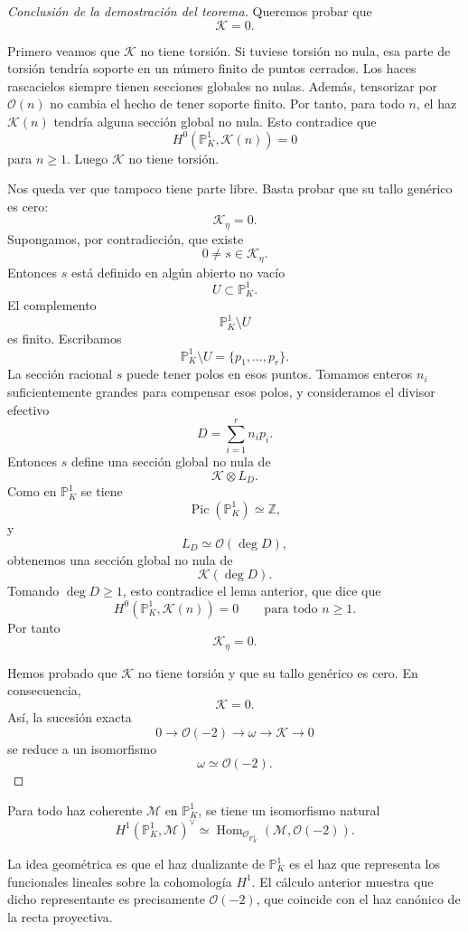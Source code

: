 \begin{proof}[Conclusión de la demostración del teorema]
Queremos probar que
\[
\mathcal{K}=0.
\]

Primero veamos que $\mathcal{K}$ no tiene torsión. Si tuviese torsión no nula, esa parte de torsión tendría soporte en un número finito de puntos cerrados. Los haces rascacielos siempre tienen secciones globales no nulas. Además, tensorizar por $\mathcal{O}(n)$ no cambia el hecho de tener soporte finito. Por tanto, para todo $n$, el haz $\mathcal{K}(n)$ tendría alguna sección global no nula. Esto contradice que
\[
H^0(\mathbb{P}^1_K,\mathcal{K}(n))=0
\]
para $n\ge 1$. Luego $\mathcal{K}$ no tiene torsión.

Nos queda ver que tampoco tiene parte libre. Basta probar que su tallo genérico es cero:
\[
\mathcal{K}_\eta=0.
\]
Supongamos, por contradicción, que existe
\[
0\neq s\in \mathcal{K}_\eta.
\]
Entonces $s$ está definido en algún abierto no vacío
\[
U\subset \mathbb{P}^1_K.
\]
El complemento
\[
\mathbb{P}^1_K\setminus U
\]
es finito. Escribamos
\[
\mathbb{P}^1_K\setminus U=\{p_1,\dots,p_r\}.
\]
La sección racional $s$ puede tener polos en esos puntos. Tomamos enteros $n_i$ suficientemente grandes para compensar esos polos, y consideramos el divisor efectivo
\[
D=\sum_{i=1}^r n_i p_i.
\]
Entonces $s$ define una sección global no nula de
\[
\mathcal{K}\otimes L_D.
\]
Como en $\mathbb{P}^1_K$ se tiene
\[
\operatorname{Pic}(\mathbb{P}^1_K)\simeq \mathbb{Z},
\]
y
\[
L_D\simeq \mathcal{O}(\deg D),
\]
obtenemos una sección global no nula de
\[
\mathcal{K}(\deg D).
\]
Tomando $\deg D\ge 1$, esto contradice el lema anterior, que dice que
\[
H^0(\mathbb{P}^1_K,\mathcal{K}(n))=0
\qquad
\text{para todo } n\ge 1.
\]
Por tanto
\[
\mathcal{K}_\eta=0.
\]

Hemos probado que $\mathcal{K}$ no tiene torsión y que su tallo genérico es cero. En consecuencia,
\[
\mathcal{K}=0.
\]
Así, la sucesión exacta
\[
0\longrightarrow \mathcal{O}(-2)
\longrightarrow \omega
\longrightarrow \mathcal{K}
\longrightarrow 0
\]
se reduce a un isomorfismo
\[
\omega\simeq \mathcal{O}(-2).
\]
\end{proof}

\begin{corollary}
Para todo haz coherente $\mathcal{M}$ en $\mathbb{P}^1_K$, se tiene un isomorfismo natural
\[
H^1(\mathbb{P}^1_K,\mathcal{M})^\vee
\simeq
\operatorname{Hom}_{\mathcal{O}_{\mathbb{P}^1_K}}(\mathcal{M},\mathcal{O}(-2)).
\]
\end{corollary}

\begin{remark}
La idea geométrica es que el haz dualizante de $\mathbb{P}^1_K$ es el haz que representa los funcionales lineales sobre la cohomología $H^1$. El cálculo anterior muestra que dicho representante es precisamente $\mathcal{O}(-2)$, que coincide con el haz canónico de la recta proyectiva.
\end{remark}
